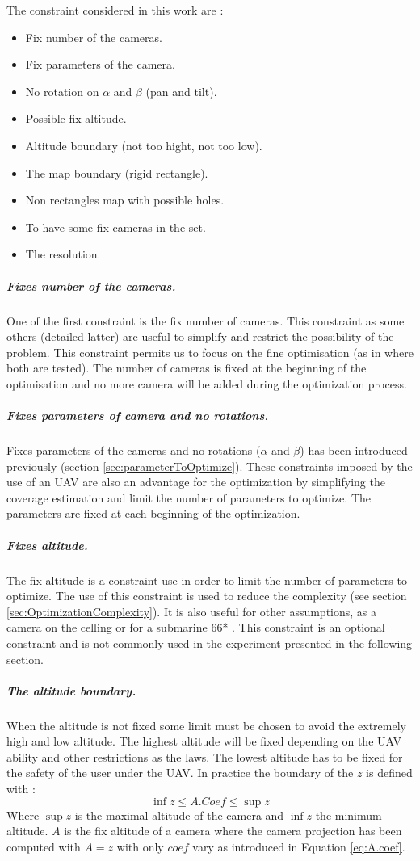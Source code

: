 The constraint considered in this work are : 
\begin{itemize}
	\item Fix number of the cameras.
	\item Fix parameters of the camera.
	\item No rotation  on  $\alpha$ and $\beta$ (pan and tilt).
	\item Possible fix altitude.
	\item Altitude boundary (not too hight, not too low).  	
	\item The map boundary (rigid rectangle).  
	\item Non rectangles map with possible holes.
	\item To have some fix cameras in the set. 
	\item The resolution.\\

\end{itemize} 
\subparagraph{Fixes number of the cameras.}
One of the first constraint is the fix number of cameras. This constraint as some others (detailed latter) are  useful to simplify and restrict the possibility of the problem. This constraint permits us to focus on the fine optimisation (as in \citep{22*zhao2008} where both are tested). The number of cameras is fixed at the beginning of the optimisation and no more camera will be added during the optimization process.  

\subparagraph{Fixes parameters of camera and no rotations.}
Fixes parameters of the cameras and no rotations ($\alpha$ and $\beta$) has been introduced previously (section \ref{sec:parameterToOptimize}). These constraints imposed by the use of an UAV are also an advantage for the optimization by simplifying the coverage estimation and limit the number of parameters to optimize. The parameters are fixed at each beginning of the optimization.

\subparagraph{Fixes altitude.}
 The fix altitude is a constraint use in order to limit the number of parameters to optimize. The use of this constraint is used to reduce the complexity (see section \ref{sec:OptimizationComplexity}). It is also useful for other assumptions, as a camera on the celling or for a submarine 66* \cite{66*}. This constraint is an optional constraint and is not commonly used in the experiment presented in the following section.   

\subparagraph{The altitude boundary.}\label{sec:altitudeBoundary}
 When the altitude is not fixed some limit must be chosen to avoid the extremely high and low altitude. The highest altitude will be fixed depending on the UAV ability and other restrictions as the laws. The lowest altitude has to be fixed for the safety of the user under the UAV.  
In practice the boundary of the $z$ is defined with :
 \begin{equation}\label{eq:boundaryZ}
   \inf z\leq A.Coef\leq \sup z  
 \end{equation} 
 Where $\sup z$ is the maximal altitude of the camera and $\inf z$ the minimum altitude. $A$ is the fix altitude  of a camera where the camera projection has been computed with $A=z$ with only $coef$ vary as introduced in Equation \ref{eq:A.coef}. 
 
